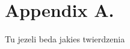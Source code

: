 \documentclass[twoside,11pt]{article}
\begin{document}
\newpage

\appendix
\section*{Appendix A.}
\label{app:theorem}



Tu jezeli beda jakies twierdzenia


\vskip 0.2in

\end{document}
